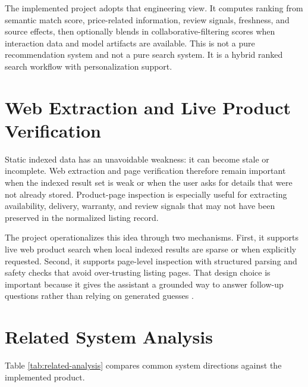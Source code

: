 \documentclass[12pt,a4paper,oneside]{report}
\begin{document}
The implemented project adopts that engineering view. It computes ranking from semantic match score, price-related information, review signals, freshness, and source effects, then optionally blends in collaborative-filtering scores when interaction data and model artifacts are available. This is not a pure recommendation system and not a pure search system. It is a hybrid ranked search workflow with personalization support.

\section{Web Extraction and Live Product Verification}
Static indexed data has an unavoidable weakness: it can become stale or incomplete. Web extraction and page verification therefore remain important when the indexed result set is weak or when the user asks for details that were not already stored. Product-page inspection is especially useful for extracting availability, delivery, warranty, and review signals that may not have been preserved in the normalized listing record.

The project operationalizes this idea through two mechanisms. First, it supports live web product search when local indexed results are sparse or when explicitly requested. Second, it supports page-level inspection with structured parsing and safety checks that avoid over-trusting listing pages. That design choice is important because it gives the assistant a grounded way to answer follow-up questions rather than relying on generated guesses \cite{playwrightdocs,bs4docs}.

\section{Related System Analysis}
Table \ref{tab:related-analysis} compares common system directions against the implemented product.
\end{document}
